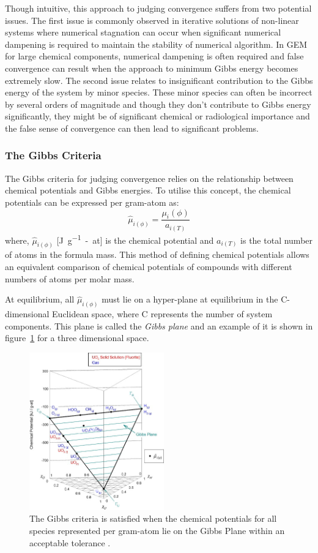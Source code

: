		Though intuitive, this approach to judging convergence suffers from two potential issues. The first issue is commonly observed in iterative solutions of non-linear systems where numerical stagnation can occur when significant numerical dampening is required to maintain the stability of numerical algorithm. In GEM for large chemical components, numerical dampening is often required and false convergence can result when the approach to minimum Gibbs energy becomes extremely slow.  The second issue relates to insignificant contribution to the Gibbs energy of the system  by minor species. These minor species can often be incorrect by several orders of magnitude and though they don't contribute to Gibbs energy significantly, they might be of significant chemical or radiological importance and the false sense of convergence can then lead to significant problems.

		\subsubsection{The Gibbs Criteria}
	 The Gibbs criteria for judging convergence relies on the relationship between chemical potentials and Gibbs energies. To utilise this concept, the chemical potentials can be expressed per gram-atom as:
	 \begin{equation}
	 	\hat{\mu}_{i(\phi)} = \frac{{\mu}_i(\phi)}{a_{i(T)}}
	 \end{equation}
	 where, $\hat{\mu}_{i(\phi)}$ [\si{\joule \per g-at}] is the chemical potential and ${a_{i(T)}}$  is the total number of atoms in the formula mass. This method of defining chemical potentials allows an equivalent comparison of chemical potentials of compounds with different numbers of atoms per molar mass.

	 At equilibrium, all $\hat{\mu}_{i(\phi)}$ must lie on a hyper-plane at equilibrium in the C-dimensional Euclidean space, where C represents the number of system components. This plane is called the \emph{Gibbs plane} and an example of it is shown in figure~\ref{fig:GibbsPlane} for a three dimensional space.
	 \begin{figure}[htbp]
		\centering
		\includegraphics[width=0.52\textwidth]{figures/Gibbs_plane.jpg}
		\caption{The Gibbs criteria is satisfied when the chemical potentials for all species represented per gram-atom lie on the Gibbs Plane within an acceptable tolerance \cite{Piro11a}.}
		\label{fig:GibbsPlane}
	\end{figure}

